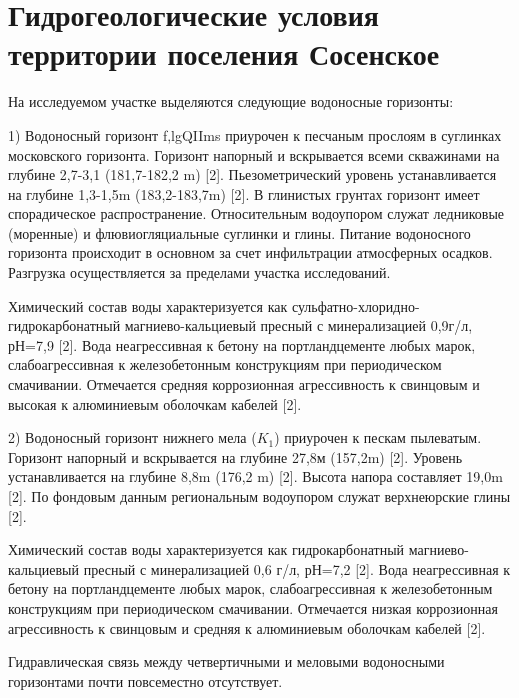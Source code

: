 \chapter{Гидрогеологические условия территории поселения Сосенское}\label{ch:ch4}

На исследуемом участке выделяются следующие водоносные горизонты:

1) Водоносный горизонт f,lgQIIms приурочен к песчаным прослоям в суглинках московского горизонта. 
Горизонт напорный и вскрывается всеми скважинами на глубине 2,7-3,1 (181,7-182,2 \si{\meter}) [2]. 
Пьезометрический уровень устанавливается на глубине 1,3-1,5\si{\meter} (183,2-183,7\si{\meter}) [2]. 
В глинистых грунтах горизонт имеет спорадическое распространение. Относительным водоупором служат ледниковые (моренные) 
и флювиогляциальные суглинки и глины. Питание водоносного горизонта происходит в основном за счет инфильтрации атмосферных осадков. 
Разгрузка осуществляется за пределами участка исследований.

Химический состав воды характеризуется как сульфатно-хлоридно-гидрокарбонатный магниево-кальциевый пресный 
с минерализацией 0,9г/л, рН=7,9 [2]. Вода неагрессивная к бетону на портландцементе любых марок, слабоагрессивная 
к железобетонным конструкциям при периодическом смачивании. Отмечается средняя коррозионная агрессивность 
к свинцовым и высокая к алюминиевым оболочкам кабелей [2].

2) Водоносный горизонт нижнего мела ($K_1$) приурочен к пескам пылеватым. Горизонт напорный и вскрывается 
на глубине 27,8м (157,2\si{\meter}) [2]. Уровень устанавливается на глубине 8,8\si{\meter} (176,2 \si{\meter}) [2]. Высота напора составляет 19,0\si{\meter} [2]. 
По фондовым данным региональным водоупором служат верхнеюрские глины [2].

Химический состав воды характеризуется как гидрокарбонатный магниево-кальциевый пресный с минерализацией 0,6 г/л, 
рН=7,2 [2]. Вода неагрессивная к бетону на портландцементе любых марок, слабоагрессивная к железобетонным конструкциям 
при периодическом смачивании. Отмечается низкая коррозионная агрессивность к свинцовым и средняя к алюминиевым оболочкам кабелей [2].

Гидравлическая связь между четвертичными и меловыми водоносными горизонтами почти повсеместно отсутствует.